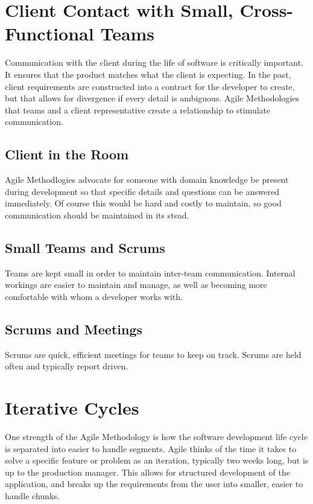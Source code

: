 \documentclass[11pt]{article}
\begin{document}
\begin{doublespace}
\section{Client Contact with Small, Cross-Functional Teams}

Communication with the client during the life of software is critically important. It ensures that the product matches
what the client is expecting. In the past, client requirements are constructed into a contract for the developer to create,
but that allows for divergence if every detail is ambiguous.  Agile Methodologies that teams and a client representative
create a relationship to stimulate communication.

\subsection{Client in the Room}
Agile Methodlogies advocate for someone with domain knowledge be present during development so that specific details and 
questions can be answered immediately. Of course this would be hard and costly to maintain, so good communication 
should be maintained in its stead.

\subsection{Small Teams and Scrums}
Teams are kept small in order to maintain inter-team communication. Internal workings are easier to maintain and manage,
as well as becoming more comfortable with whom a developer works with.

\subsection{Scrums and Meetings}
Scrums are quick, efficient meetings for
teams to keep on track. Scrums are held often and typically report driven.

\section{Iterative Cycles}

One strength of the Agile Methodology is how the software development life cycle is separated into easier to handle segments.
Agile thinks of the time it takes to solve a specific feature or problem as an iteration, typically two weeks long, but
is up to the production manager. This allows for structured development of the application, and breaks
up the requirements from the user into smaller, easier to handle chunks. 


\end{doublespace}
\end{document}
